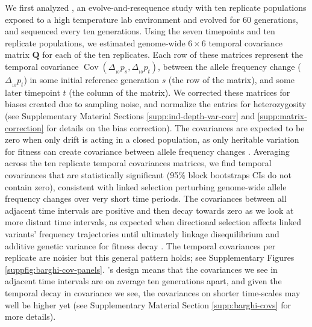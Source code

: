 \documentclass[11pt]{article}
\DeclareMathOperator{\cov}{Cov}
\begin{document}
We first analyzed \textcite{Barghi2019-qy}, an evolve-and-resequence study with
ten replicate populations exposed to a high temperature lab environment and
evolved for 60 generations, and sequenced every ten generations. Using the
seven timepoints and ten replicate populations, we estimated genome-wide $6
\times 6$ temporal covariance matrix $\mathbf{Q}$ for each of the ten
replicates. Each row of these matrices represent the temporal covariance
$\cov(\Delta_{_{10}} p_s, \Delta_{_{10}} p_t)$, between the allele frequency
change ($\Delta_{_{10}} p_t$) in some initial reference generation $s$ (the row
of the matrix), and some later timepoint $t$ (the column of the matrix). We
corrected these matrices for biases created due to sampling noise, and
normalize the entries for heterozygosity (see Supplementary Material Sections
\ref{supp:ind-depth-var-corr} and \ref{supp:matrix-correction} for details on
the bias correction). The covariances are expected to be zero when only drift
is acting in a closed population, as only heritable variation for fitness can
create covariance between allele frequency changes \parencite{Buffalo2019-io}.
Averaging across the ten replicate temporal covariances matrices, we find
temporal covariances that are statistically significant (95\% block bootstraps
CIs do not contain zero), consistent with linked selection perturbing
genome-wide allele frequency changes over very short time periods. The
covariances between all adjacent time intervals are positive and then decay
towards zero as we look at more distant time intervals, as expected when
directional selection affects linked variants' frequency trajectories until
ultimately linkage disequilibrium and additive genetic variance for fitness
decay \parencite{Buffalo2019-io}. The temporal covariances per replicate are
noisier but this general pattern holds; see Supplementary Figures
\ref{suppfig:barghi-cov-panels}.  \textcite{Barghi2019-qy}'s design means that
the covariances we see in adjacent time intervals are on average ten
generations apart, and given the temporal decay in covariance we see, the
covariances on shorter time-scales may well be higher yet (see Supplementary
Material Section \ref{supp:barghi-covs} for more details).

\end{document}
